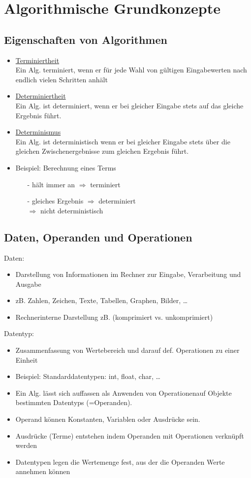 \section{Algorithmische Grundkonzepte}
 \subsection{Eigenschaften von Algorithmen}
  \begin{itemize}
   \item \underline{Terminiertheit} \\
    Ein Alg. terminiert, wenn er für jede Wahl von gültigen Eingabewerten nach endlich vielen Schritten anhält
   \item \underline{Determiniertheit} \\
    Ein Alg. ist determiniert, wenn er bei gleicher Eingabe stets auf das gleiche Ergebnis führt.
   \item \underline{Determinismus} \\
    Ein Alg. ist deterministisch wenn er bei gleicher Eingabe stets über die gleichen Zwischenergebnisse zum gleichen Ergebnis führt.
    \item Beispiel: Berechnung eines Terms
    \begin{itemize}
     \item[-] hält immer an $\Rightarrow$ terminiert
     \item[-] gleiches Ergebnis $\Rightarrow$ determiniert \\
      $\Rightarrow$ nicht deterministisch
    \end{itemize}
   \end{itemize}
 \subsection{Daten, Operanden und Operationen}
 Daten:
 \begin{itemize}
 \item Darstellung von Informationen im Rechner zur Eingabe, Verarbeitung und Ausgabe
 \item zB. Zahlen, Zeichen, Texte, Tabellen, Graphen, Bilder, \dots
 \item Rechnerinterne Darstellung zB. (komprimiert vs. unkomprimiert)
 \end{itemize}
 Datentyp:
 \begin{itemize}
  \item Zusammenfassung von Wertebereich und darauf def. Operationen zu einer Einheit
  \item Beispiel: Standarddatentypen: int, float, char, \dots
  \item Ein Alg. lässt sich auffassen als Anwenden von Operationenauf Objekte bestimmten Datentyps (=Operanden).
  \item Operand können Konstanten, Variablen oder Ausdrücke sein.
  \item Ausdrücke (Terme) entstehen indem Operanden mit Operationen verknüpft werden
  \item Datentypen legen die Wertemenge fest, aus der die Operanden Werte annehmen können
 \end{itemize}
 ~\\
